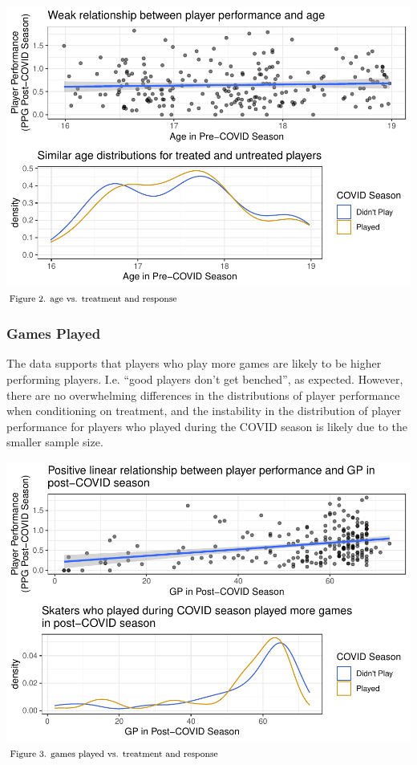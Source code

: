 \documentclass[12pt]{article}
\begin{document}
\includegraphics{journal-article-nb_files/figure-latex/age-plots-1.pdf}
\(\hspace*{\fill} \footnotesize \text{Figure 2. age vs. treatment and response}\)

\hypertarget{games-played}{%
\subsubsection{Games Played}\label{games-played}}

The data supports that players who play more games are likely to be
higher performing players. I.e. ``good players don't get benched'', as
expected. However, there are no overwhelming differences in the
distributions of player performance when conditioning on treatment, and
the instability in the distribution of player performance for players
who played during the COVID season is likely due to the smaller sample
size.

\includegraphics{journal-article-nb_files/figure-latex/gp-plots-1.pdf}
\(\hspace*{\fill} \footnotesize \text{Figure 3. games played vs. treatment and response}\)
\end{document}
